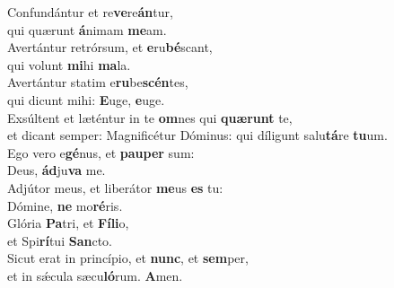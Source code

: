 \evenverse Confundántur et re\textbf{ve}re\textbf{án}tur,~\*\\
\evenverse qui quærunt \textbf{á}nimam \textbf{me}am.\\
\oddverse Avertántur retrórsum, et \textbf{e}ru\textbf{bé}scant,~\*\\
\oddverse qui volunt \textbf{mi}hi \textbf{ma}la.\\
\evenverse Avertántur statim e\textbf{ru}be\textbf{scén}tes,~\*\\
\evenverse qui dicunt mihi: \textbf{E}uge, \textbf{e}uge.\\
\oddverse Exsúltent et læténtur in te \textbf{om}nes qui \textbf{quæ}\textbf{runt} te,~\*\\
\oddverse et dicant semper: Magnificétur Dóminus: qui díligunt salu\textbf{tá}re \textbf{tu}um.\\
\evenverse Ego vero e\textbf{gé}nus, et \textbf{pau}\textbf{per} sum:~\*\\
\evenverse Deus, \textbf{ád}ju\textbf{va} me.\\
\oddverse Adjútor meus, et liberátor \textbf{me}us \textbf{es} tu:~\*\\
\oddverse Dómine, \textbf{ne} mo\textbf{ré}ris.\\
\evenverse Glória \textbf{Pa}tri, et \textbf{Fí}\textbf{li}o,~\*\\
\evenverse et Spi\textbf{rí}tui \textbf{San}cto.\\
\oddverse Sicut erat in princípio, et \textbf{nunc}, et \textbf{sem}per,~\*\\
\oddverse et in sǽcula sæcu\textbf{ló}rum. \textbf{A}men.\\
